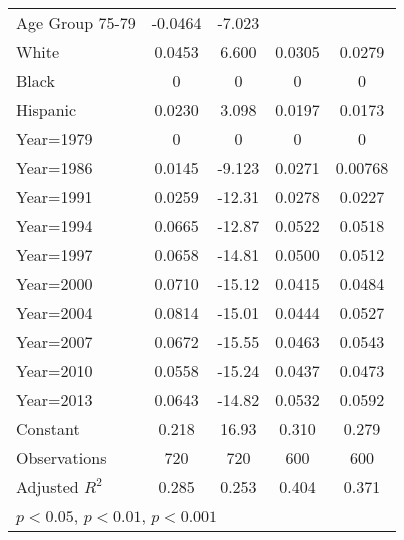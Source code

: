 \begin{table}[htbp]
\begin{tabular}{l*{4}{c}}
Age Group 75-79     &     -0.0464\sym{***}&      -7.023\sym{**} &                     &                     \\
White               &      0.0453\sym{***}&       6.600\sym{***}&      0.0305\sym{***}&      0.0279\sym{***}\\
Black               &           0         &           0         &           0         &           0         \\
Hispanic            &      0.0230\sym{***}&       3.098\sym{**} &      0.0197\sym{***}&      0.0173\sym{***}\\
Year=1979           &           0         &           0         &           0         &           0         \\
Year=1986           &      0.0145         &      -9.123\sym{***}&      0.0271\sym{***}&     0.00768         \\
Year=1991           &      0.0259\sym{*}  &      -12.31\sym{***}&      0.0278\sym{***}&      0.0227\sym{**} \\
Year=1994           &      0.0665\sym{***}&      -12.87\sym{***}&      0.0522\sym{***}&      0.0518\sym{***}\\
Year=1997           &      0.0658\sym{***}&      -14.81\sym{***}&      0.0500\sym{***}&      0.0512\sym{***}\\
Year=2000           &      0.0710\sym{***}&      -15.12\sym{***}&      0.0415\sym{***}&      0.0484\sym{***}\\
Year=2004           &      0.0814\sym{***}&      -15.01\sym{***}&      0.0444\sym{***}&      0.0527\sym{***}\\
Year=2007           &      0.0672\sym{***}&      -15.55\sym{***}&      0.0463\sym{***}&      0.0543\sym{***}\\
Year=2010           &      0.0558\sym{***}&      -15.24\sym{***}&      0.0437\sym{***}&      0.0473\sym{***}\\
Year=2013           &      0.0643\sym{***}&      -14.82\sym{***}&      0.0532\sym{***}&      0.0592\sym{***}\\
Constant            &       0.218\sym{***}&       16.93\sym{***}&       0.310\sym{***}&       0.279\sym{***}\\
\hline
Observations        &         720         &         720         &         600         &         600         \\
Adjusted \(R^{2}\)  &       0.285         &       0.253         &       0.404         &       0.371         \\
\hline\hline
\multicolumn{5}{l}{\footnotesize \sym{*} \(p<0.05\), \sym{**} \(p<0.01\), \sym{***} \(p<0.001\)}\\
\end{tabular}
\end{table}
